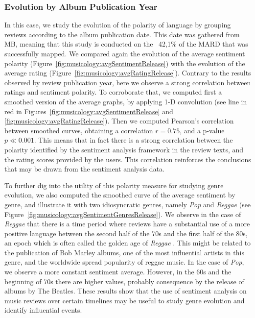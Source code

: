 \subsubsection{Evolution by Album Publication Year}

In this case, we study the evolution of the polarity of language by grouping reviews according to the album publication date. This date was gathered from MB, meaning that this study is conducted on the ~42,1\% of the MARD that was successfully mapped. We compared again the evolution of the average sentiment polarity (Figure~\ref{fig:musicology:avgSentimentRelease}) with the evolution of the average rating (Figure~\ref{fig:musicology:avgRatingRelease}). Contrary to the results observed by review publication year, here we observe a strong correlation between ratings and sentiment polarity. To corroborate that, we computed first a smoothed version of the average graphs, by applying 1-D convolution (see line in red in Figures~\ref{fig:musicology:avgSentimentRelease} and \ref{fig:musicology:avgRatingRelease}). Then we computed Pearson's correlation between smoothed curves, obtaining a correlation $r = 0.75$, and a p-value $p \ll 0.001$. This means that in fact there is a strong correlation between the polarity identified by the sentiment analysis framework in the review texts, and the rating scores provided by the users. This correlation reinforces the conclusions that may be drawn from the sentiment analysis data. %

To further dig into the utility of this polarity measure for studying genre evolution, we also computed the smoothed curve of the average sentiment by genre, and illustrate it with two idiosyncratic genres, namely \textit{Pop} and \textit{Reggae} (see  Figure~\ref{fig:musicology:avgSentimentGenresRelease}). We observe in the case of \textit{Reggae} that there is a time period where reviews have a substantial use of a more positive language between the second half of the 70s and the first half of the 80s, an epoch which is often called the golden age of \textit{Reggae} \cite{alleyne2012encyclopedia}. This might be related to the publication of Bob Marley albums, one of the most influential artists in this genre, and the worldwide spread popularity of reggae music. In the case of \textit{Pop}, we observe a more constant sentiment average. However, in the 60s and the beginning of 70s there are higher values, probably consequence by the release of albums by The Beatles. These results show that the use of sentiment analysis on music reviews over certain timelines may be useful to study genre evolution and identify influential events.


